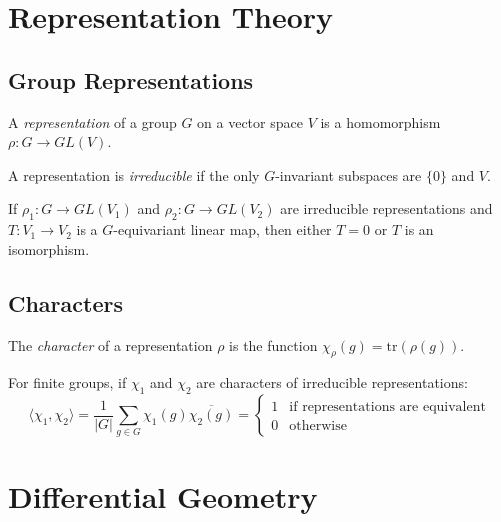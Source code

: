 \section{Representation Theory}

\subsection{Group Representations}

\begin{definition}
A \emph{representation} of a group $G$ on a vector space $V$ is a homomorphism $\rho: G \to GL(V)$.
\end{definition}

\begin{definition}
A representation is \emph{irreducible} if the only $G$-invariant subspaces are $\{0\}$ and $V$.
\end{definition}

\begin{theorem}
If $\rho_1: G \to GL(V_1)$ and $\rho_2: G \to GL(V_2)$ are irreducible representations and $T: V_1 \to V_2$ is a $G$-equivariant linear map, then either $T = 0$ or $T$ is an isomorphism.
\end{theorem}

\subsection{Characters}

\begin{definition}[Character]
The \emph{character} of a representation $\rho$ is the function $\chi_{\rho}(g) = \text{tr}(\rho(g))$.
\end{definition}

\begin{theorem}
For finite groups, if $\chi_1$ and $\chi_2$ are characters of irreducible representations:
\[
\langle \chi_1, \chi_2 \rangle = \frac{1}{|G|} \sum_{g \in G} \chi_1(g) \overline{\chi_2(g)} = \begin{cases}
1 & \text{if representations are equivalent} \\
0 & \text{otherwise}
\end{cases}
\]
\end{theorem}

\section{Differential Geometry}

